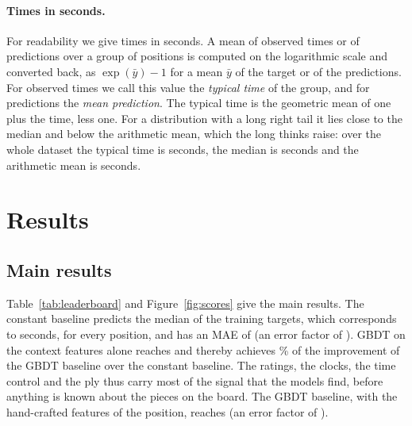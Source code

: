 \documentclass[11pt]{article}
\begin{document}
\paragraph{Times in seconds.}
For readability we give times in seconds. A mean of observed times or of
predictions over a group of positions is computed on the logarithmic scale
and converted back, as $\exp(\bar{y}) - 1$ for a mean $\bar{y}$ of the target
or of the predictions. For observed times we call this value the
\emph{typical time} of the group, and for predictions the \emph{mean
prediction}. The typical time is the geometric mean of one plus the time,
less one. For a distribution with a long right tail it lies close to the
median and below the arithmetic mean, which the long thinks raise\iflook:
over the whole dataset the typical time is  seconds, the median
is  seconds and the arithmetic mean is
 seconds\fi.



\section{Results}
\label{sec:results}

\subsection{Main results}

Table~\ref{tab:leaderboard} and Figure~\ref{fig:scores} give the main
results. The constant baseline predicts the median of the training targets,
which corresponds to  seconds, for every position, and has
an MAE of  (an error factor of ). GBDT on
the context features alone reaches  and thereby
achieves \% of the improvement of the GBDT baseline
over the constant baseline. The ratings, the clocks, the time control and the
ply thus carry most of the signal that the models find, before anything is
known about the pieces on the board. The GBDT baseline, with the hand-crafted
features of
the position, reaches  (an error factor of
).

\begin{table}[htbp]\centering\small
{}
\caption{Main results on the  test positions, best first.
The gain is the paired difference in MAE from  on the same
resampled games. It is positive when the model is better, and bold when
statistically significant.}
\label{tab:leaderboard}
\end{table}
\end{document}
